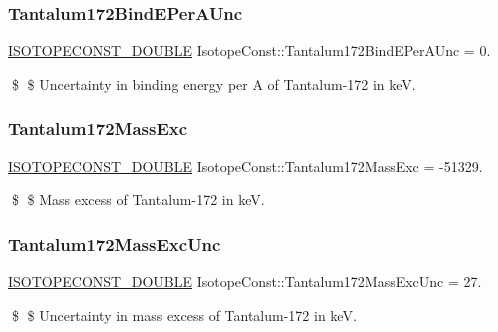 \subsubsection{\texorpdfstring{Tantalum172\+Bind\+E\+Per\+A\+Unc}{Tantalum172BindEPerAUnc}}
{\footnotesize\ttfamily \mbox{\hyperlink{group___isotope_const-_macros_ga8f45a7272ce02c0b4c65c44636ed719a}{I\+S\+O\+T\+O\+P\+E\+C\+O\+N\+S\+T\+\_\+\+D\+O\+U\+B\+LE}} Isotope\+Const\+::\+Tantalum172\+Bind\+E\+Per\+A\+Unc = 0.}

\$ \$ Uncertainty in binding energy per A of Tantalum-\/172 in keV. \mbox{\label{group___isotope_const-_tantalum-_ta172_gac387326fd8971314ba6f462edabc3537}} 
\subsubsection{\texorpdfstring{Tantalum172\+Mass\+Exc}{Tantalum172MassExc}}
{\footnotesize\ttfamily \mbox{\hyperlink{group___isotope_const-_macros_ga8f45a7272ce02c0b4c65c44636ed719a}{I\+S\+O\+T\+O\+P\+E\+C\+O\+N\+S\+T\+\_\+\+D\+O\+U\+B\+LE}} Isotope\+Const\+::\+Tantalum172\+Mass\+Exc = -\/51329.}

\$ \$ Mass excess of Tantalum-\/172 in keV. \mbox{\label{group___isotope_const-_tantalum-_ta172_ga008a7ab1fb43b6c85cb9cf0f6f24b793}} 
\subsubsection{\texorpdfstring{Tantalum172\+Mass\+Exc\+Unc}{Tantalum172MassExcUnc}}
{\footnotesize\ttfamily \mbox{\hyperlink{group___isotope_const-_macros_ga8f45a7272ce02c0b4c65c44636ed719a}{I\+S\+O\+T\+O\+P\+E\+C\+O\+N\+S\+T\+\_\+\+D\+O\+U\+B\+LE}} Isotope\+Const\+::\+Tantalum172\+Mass\+Exc\+Unc = 27.}

\$ \$ Uncertainty in mass excess of Tantalum-\/172 in keV. \mbox{\label{group___isotope_const-_tantalum-_ta172_ga1140d1641c387d1ebefc5ca7d75c5ceb}} 
